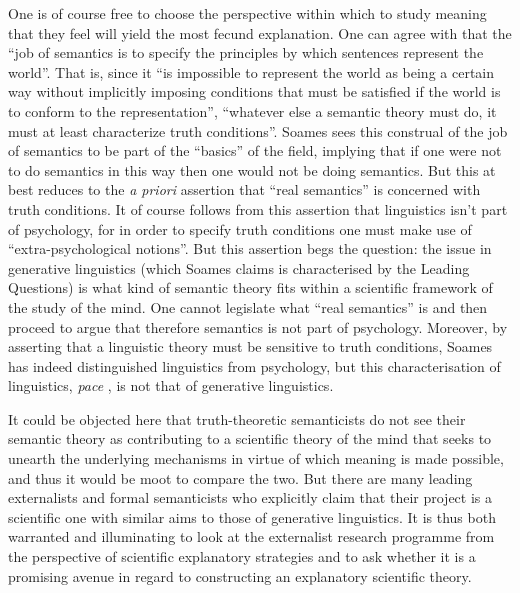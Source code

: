 One is of course free to choose the perspective within which to study meaning that they feel will yield the most fecund explanation. One can agree with \citet[183]{Soames2009} that the “job of semantics is to specify the principles by which sentences represent the world”. That is, since it “is impossible to represent the world as being a certain way without implicitly imposing conditions that must be satisfied if the world is to conform to the representation”, “whatever else a semantic theory must do, it must at least characterize truth conditions”. Soames sees this construal of the job of semantics to be part of the “basics” of the field, implying that if one were not to do semantics in this way then one would not be doing semantics. But this at best reduces to the \textit{a priori} assertion that “real semantics” \citep{Lewis1970} is concerned with truth conditions. It of course follows from this assertion that linguistics isn’t part of psychology, for in order to specify truth conditions one must make use of “extra-psychological notions”. But this assertion begs the question: the issue in generative linguistics (which Soames claims is characterised by the Leading Questions) is what kind of semantic theory fits within a scientific framework of the study of the mind. One cannot legislate what “real semantics” is and then proceed to argue that therefore semantics is not part of psychology. Moreover, by asserting that a linguistic theory must be sensitive to truth conditions, Soames has indeed distinguished linguistics from psychology, but this characterisation of linguistics, \textit{pace} \citet[178, fn. 24]{Soames1984}, is not that of generative linguistics.

It could be objected here that truth-theoretic semanticists do not see their semantic theory as contributing to a scientific theory of the mind that seeks to unearth the underlying mechanisms in virtue of which meaning is made possible, and thus it would be moot to compare the two. But there are many leading externalists and formal semanticists who explicitly claim that their project is a scientific one with similar aims to those of generative linguistics. It is thus both warranted and illuminating to look at the externalist research programme from the perspective of scientific explanatory strategies and to ask whether it is a promising avenue in regard to constructing an explanatory scientific theory.

